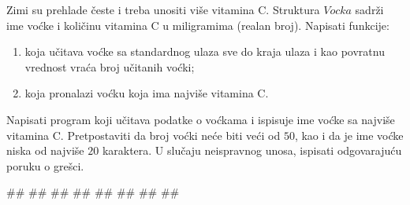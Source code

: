 
\begin{Exercise}[label=struc.2] 
 Zimi su prehlade česte i treba unositi više vitamina C. Struktura
 $Vocka$ sadrži ime voćke i
 količinu vitamina C u miligramima (realan broj). Napisati funkcije:
\begin{enumerate}
  \item {} koja učitava voćke sa standardnog ulaza
     sve do kraja ulaza i kao povratnu vrednost vraća broj učitanih voćki;
  \item {}
     koja pronalazi voćku koja ima najviše vitamina C.
\end{enumerate}
 Napisati program koji učitava podatke o voćkama i ispisuje ime voćke sa najviše vitamina C. 
 Pretpostaviti da broj voćki neće biti veći od $50$, kao i da je ime voćke niska od najviše $20$ karaktera. 
 U slučaju neispravnog unosa, ispisati odgovarajuću poruku o grešci.
 
\begin{maxitest}
\begin{upotreba}{1}
#\naslovInt#
##
##
##
##
##
#\ulaz{}#
##
\end{upotreba}
\end{maxitest}

\end{Exercise}
\ifresenja
\begin{Answer}[ref=struc.2]
\end{Answer}
\fi


